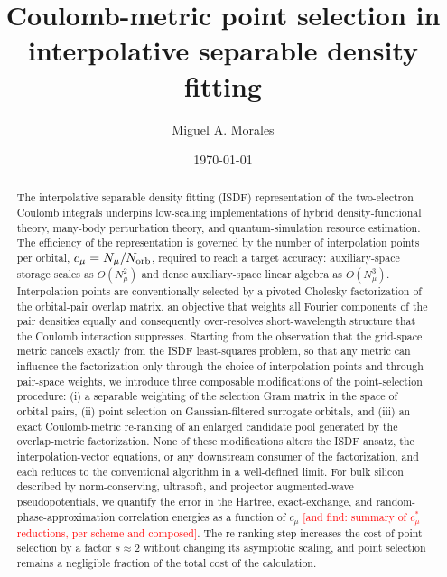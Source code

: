 \documentclass[aps,prb,twocolumn,superscriptaddress,amsmath,amssymb]{revtex4-2}
\newcommand{\Nmu}{N_\mu}
\newcommand{\cmu}{c_\mu}
\newcommand{\todo}[1]{\textcolor{red}{[#1]}}
\begin{document}
\title{Coulomb-metric point selection in interpolative separable density fitting}

\author{Miguel A. Morales}

\date{\today}

\begin{abstract}
The interpolative separable density fitting (ISDF) representation of the
two-electron Coulomb integrals underpins low-scaling implementations of
hybrid density-functional theory, many-body perturbation theory, and
quantum-simulation resource estimation. The efficiency of the representation
is governed by the number of interpolation points per orbital,
$\cmu = \Nmu/N_{\rm orb}$, required to reach a target accuracy:
auxiliary-space storage scales as $O(\Nmu^{2})$ and dense auxiliary-space
linear algebra as $O(\Nmu^{3})$. Interpolation points are conventionally
selected by a pivoted Cholesky factorization of the orbital-pair overlap
matrix, an objective that weights all Fourier components of the pair
densities equally and consequently over-resolves short-wavelength structure
that the Coulomb interaction suppresses. Starting from the observation that
the grid-space metric cancels exactly from the ISDF least-squares problem,
so that any metric can influence the factorization only through the choice
of interpolation points and through pair-space weights, we introduce three
composable modifications of the point-selection procedure: (i) a separable
weighting of the selection Gram matrix in the space of orbital pairs,
(ii) point selection on Gaussian-filtered surrogate orbitals, and (iii) an
exact Coulomb-metric re-ranking of an enlarged candidate pool generated by
the overlap-metric factorization. None of these modifications alters the
ISDF ansatz, the interpolation-vector equations, or any downstream consumer
of the factorization, and each reduces to the conventional algorithm in a
well-defined limit. For bulk silicon described by norm-conserving,
ultrasoft, and projector augmented-wave pseudopotentials, we quantify the
error in the Hartree, exact-exchange, and random-phase-approximation
correlation energies as a function of $\cmu$
\todo{and find: summary of $\cmu^{*}$ reductions, per scheme and composed}.
The re-ranking step increases the cost of point selection by a factor
$s \approx 2$ without changing its asymptotic scaling, and point selection
remains a negligible fraction of the total cost of the calculation.
\end{abstract}
\end{document}
